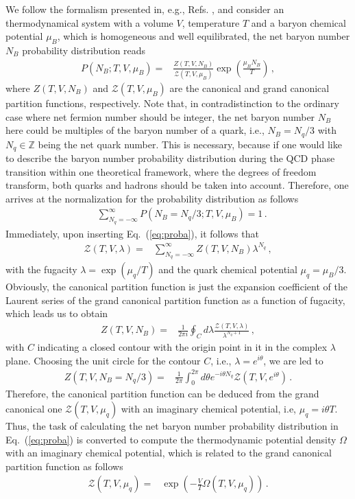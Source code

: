 \documentclass[%
reprint,
superscriptaddress,
showpacs,preprintnumbers,
 amsmath,amssymb,
 aps,
prd,
]{revtex4-1}
\def\Eq#1{Eq.~(\ref{#1})}
\begin{document}
We follow the formalism presented in, e.g., Refs. \cite{Morita:2013tu,Morita:2014fda}, and consider an thermodynamical system with a volume $V$, temperature $T$ and a baryon chemical potential $\mu_B$, which is homogeneous and well equilibrated, the net baryon number $N_B$ probability distribution reads
\begin{align}
  P(N_B;T,V,\mu_B)=&\frac{Z(T,V,N_B)}{\mathcal{Z}(T,V,\mu_B)}\exp\left(\frac{\mu_B N_B}{T}\right)\,,\label{eq:proba}
\end{align}
where $Z(T,V,N_B)$ and $\mathcal{Z}(T,V,\mu_B)$ are the canonical and grand canonical partition functions, respectively. 
Note that, in contradistinction to the ordinary case where net fermion number should be integer, the net baryon number $N_B$ here could be multiples of the baryon number of a quark, i.e., $N_B=N_q/3$ with $N_q\in \mathbb{Z}$ being the net quark number. This is necessary, because if one would like to describe the baryon number probability distribution during the QCD phase transition within one theoretical framework, where the degrees of freedom transform, both quarks and hadrons should be taken into account. Therefore, one arrives at the normalization for the probability distribution as follows
\begin{align}
  &\sum_{N_q=-\infty}^{\infty}P(N_B=N_q/3;T,V,\mu_B)=1\,.\label{eq:norma}
\end{align}
Immediately, upon inserting \Eq{eq:proba},  it follows that 
\begin{align}
  \mathcal{Z}(T,V,\lambda)=& \sum_{N_q=-\infty}^{\infty}Z(T,V,N_B) \lambda^{N_q}\,,\label{}
\end{align}
with the fugacity $\lambda=\exp(\mu_q/T)$ and the quark chemical potential $\mu_q=\mu_B/3$. Obviously, the canonical partition function is just the expansion coefficient of the Laurent series of the grand canonical partition function as a function of fugacity, which leads us to obtain
\begin{align}
  Z(T,V,N_B)=&\frac{1}{2\pi i} \oint_C d \lambda \frac{\mathcal{Z}(T,V,\lambda)}{\lambda^{N_q+1}} \,,\label{}
\end{align}
with $C$ indicating a closed contour with the origin point in it in the complex $\lambda$ plane. Choosing the unit circle for the contour $C$, i.e., $\lambda=e^{i \theta}$, we are led to
\begin{align}
  Z(T,V,N_B=N_q/3)=&\frac{1}{2\pi } \int_{0}^{2\pi } d \theta e^{-i \theta N_q} \mathcal{Z}(T,V,e^{i \theta})\,.\label{eq:Zintegral}
\end{align}
Therefore, the canonical partition function can be deduced from the grand canonical one $\mathcal{Z}(T,V,\mu_q)$ with an imaginary chemical potential, i.e, $\mu_q=i \theta T$. Thus, the task of calculating the net baryon number probability distribution in \Eq{eq:proba} is converted to compute the thermodynamic potential density $\Omega$ with an imaginary chemical potential, which is related to the grand canonical partition function as follows
\begin{align}
  \mathcal{Z}(T,V,\mu_q)=&\exp\left(-\frac{V}{T}\Omega(T,V,\mu_q)\right)\,.\label{eq:Zomega}
\end{align}
\end{document}
